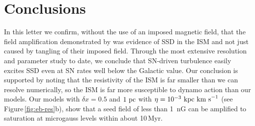 \documentclass[preprint2]{aastex63}
\newcommand\kpc{~ {\rm kpc}}
\newcommand\pc{~ {\rm pc}}
\newcommand\dx{ {\delta x}}
\newcommand\kms{~ {\rm km~ s}^{-1}}
\begin{document}
\section{Conclusions}\label{sec:conc}

In this letter we confirm, without the use of an imposed magnetic field, that
the field amplification demonstrated by \citet{BKMM04} was evidence of SSD in
the ISM and not just caused by tangling of their imposed field.
Through the most extensive resolution and parameter study to date, we conclude
that SN-driven turbulence easily excites SSD even at SN rates well below the
Galactic value.
Our conclusion is supported by noting that the resistivity of the ISM is far
smaller than we can resolve numerically, so the ISM is far more susceptible to
dynamo action than our models.
Our models with $\dx=0.5$ and $1\pc$ with $\eta=10^{-3}\kpc\kms$ (see
Figure\,\ref{fig:eb-res}b), show that a seed field of less than 1~nG can be
amplified to saturation at microgauss levels within about 10\,Myr.
\end{document}
